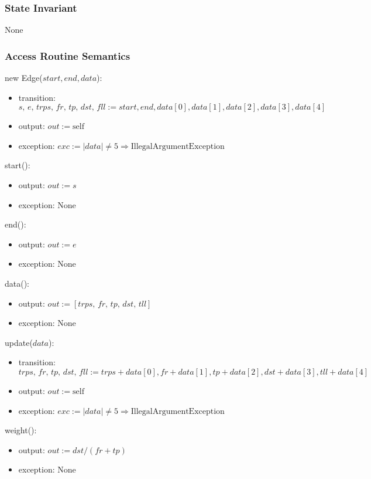 \documentclass[12pt]{article}
\begin{document}
\subsubsection*{State Invariant}

None

\subsubsection*{Access Routine Semantics}

\noindent new Edge($start, end, data$):
\begin{itemize}
	\item transition: $\textit{s, e, trps, fr, tp, dst, fll} := start, end, data[0], data[1], data[2], data[3], data[4]$
	\item output: $out := \mbox{self}$
	\item exception: $exc := |data| \neq 5 \Rightarrow \text{IllegalArgumentException}$
\end{itemize}

\noindent start():
\begin{itemize}
	\item output: $out := \textit{s}$
	\item exception: None
\end{itemize}

\noindent end():
\begin{itemize}
	\item output: $out := \textit{e}$
	\item exception: None
\end{itemize}

\noindent data():
\begin{itemize}
	\item output: $out := [\textit{trps, fr, tp, dst, tll} ]$
	\item exception: None
\end{itemize}

\noindent update($data$):
\begin{itemize}
	\item transition: $\textit{trps, fr, tp, dst, fll} := trps + data[0], fr + data[1], tp + data[2], dst + data[3], tll + data[4]$
	\item output: $out := \mbox{self}$
	\item exception: $exc := |data| \neq 5 \Rightarrow \text{IllegalArgumentException}$
\end{itemize}

\noindent weight():
\begin{itemize}
	\item output: $out := dst / (fr + tp)$
	\item exception: None
\end{itemize}
\end{document}
